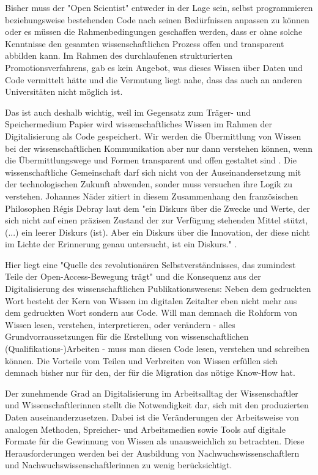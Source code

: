 Bisher muss der "Open Scientist" entweder in der Lage sein, selbst programmieren beziehungsweise bestehenden Code nach seinen Bedürfnissen anpassen zu können oder es müssen die Rahmenbedingungen geschaffen werden, dass er ohne solche Kenntnisse den gesamten wissenschaftlichen Prozess offen und transparent abbilden kann. Im Rahmen des durchlaufenen strukturierten Promotionsverfahrens, gab es kein Angebot, was dieses Wissen über Daten und Code vermittelt hätte und die Vermutung liegt nahe, dass das auch an anderen Universitäten nicht möglich ist.

Das ist auch deshalb wichtig, weil im Gegensatz zum Träger- und Speichermedium Papier wird wissenschaftliches Wissen im Rahmen der Digitalisierung als Code gespeichert. Wir werden die Übermittlung von Wissen bei der wissenschaftlichen Kommunikation aber nur dann verstehen können, wenn die Übermittlungswege und Formen transparent und offen gestaltet sind \cite{davis_2011_open}. Die wissenschaftliche Gemeinschaft darf sich nicht von der Auseinandersetzung mit der technologischen Zukunft abwenden, sonder muss versuchen ihre Logik zu verstehen. Johannes Näder zitiert in diesem Zusammenhang den französischen Philosophen Régis Debray laut dem "ein Diskurs über die Zwecke und Werte, der sich nicht auf einen präzisen Zustand der zur Verfügung stehenden Mittel stützt, (...) ein leerer Diskurs (ist). Aber ein Diskurs über die Innovation, der diese nicht im Lichte der Erinnerung genau untersucht, ist ein Diskurs." \cite[:117]{naeder_2010_open} \cite[:246]{debray2003einfuhrung}.

Hier liegt eine "Quelle des revolutionären Selbstverständnisses, das zumindest Teile der Open-Access-Bewegung trägt" und die Konsequenz aus der Digitalisierung des wissenschaftlichen Publikationswesens: Neben dem gedruckten Wort besteht der Kern von Wissen im digitalen Zeitalter eben nicht mehr aus dem gedruckten Wort sondern aus Code. Will man demnach die Rohform von Wissen lesen, verstehen, interpretieren, oder verändern - alles Grundvorraussetzungen für die Erstellung von wissenschaftlichen (Qualifikations-)Arbeiten - muss man diesen Code lesen, verstehen und schreiben können. Die Vorteile vom Teilen und Verbreiten von Wissen erfüllen sich demnach bisher nur für den, der für die Migration das nötige Know-How hat.

Der zunehmende Grad an Digitalisierung im Arbeitsalltag der Wissenschaftler und Wissenschaftlerinnen stellt die Notwendigkeit dar, sich mit den produzierten Daten auseinanderzusetzen. Dabei ist die Veränderungen der Arbeitsweise von analogen Methoden, Spreicher- und Arbeitsmedien sowie Tools auf digitale Formate für die Gewinnung von Wissen als unausweichlich zu betrachten. Diese Herausforderungen werden bei der Ausbildung von Nachwuchswissenschaftlern und Nachwuchswissenschaftlerinnen zu wenig berücksichtigt.

